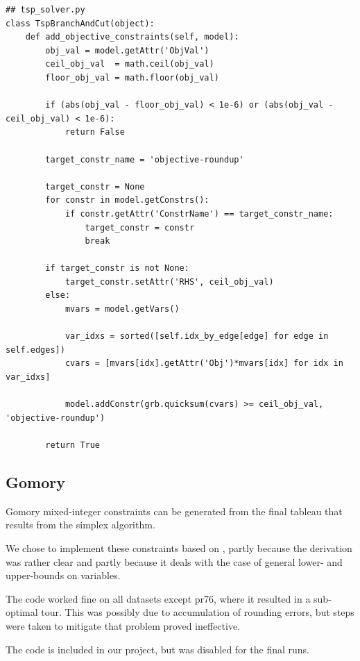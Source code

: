 \documentclass{article}
\begin{document}
\begin{flushleft}
\begin{lstlisting}
## tsp_solver.py
class TspBranchAndCut(object):
    def add_objective_constraints(self, model):
        obj_val = model.getAttr('ObjVal')
        ceil_obj_val  = math.ceil(obj_val)
        floor_obj_val = math.floor(obj_val)

        if (abs(obj_val - floor_obj_val) < 1e-6) or (abs(obj_val - ceil_obj_val) < 1e-6):
            return False

        target_constr_name = 'objective-roundup'

        target_constr = None
        for constr in model.getConstrs():
            if constr.getAttr('ConstrName') == target_constr_name:
                target_constr = constr
                break

        if target_constr is not None:
            target_constr.setAttr('RHS', ceil_obj_val)
        else:
            mvars = model.getVars()

            var_idxs = sorted([self.idx_by_edge[edge] for edge in self.edges])
            cvars = [mvars[idx].getAttr('Obj')*mvars[idx] for idx in var_idxs]

            model.addConstr(grb.quicksum(cvars) >= ceil_obj_val, 'objective-roundup')

        return True
\end{lstlisting}

\subsection{Gomory}
\begin{flushleft}

Gomory mixed-integer constraints
can be generated from the final tableau
that results from the simplex algorithm.

We chose to implement these constraints
based on \cite{gomory},
partly because the derivation was rather clear
and partly because it deals with the case
of general lower- and upper-bounds on variables.

The code worked fine on all datasets except pr76,
where it resulted in a sub-optimal tour.
This was possibly due to accumulation of rounding errors,
but steps were taken to mitigate that problem proved ineffective.

The code is included in our project,
but was disabled for the final runs.

\end{flushleft}

\end{flushleft}
\end{document}
